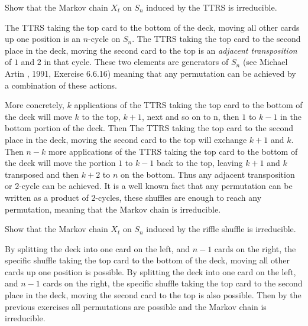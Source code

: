 \documentclass[12pt]{article}
\begin{document}
\begin{exercise}
    Show that the Markov chain \( X_t \) on \( S_n \) induced by the
    TTRS is irreducible.
\end{exercise}
\begin{solution}
    The TTRS taking the top card to the bottom of the deck, moving all
    other cards up one position is an \( n \)-cycle on \( S_n \). The
    TTRS taking the top card to the second place in the deck, moving the
    second card to the top is an \emph{adjacent transposition} of \( 1 \)
    and \( 2 \) in that cycle.  These two elements are generators of \(
    S_n \) (see Michael Artin , 1991, Exercise 6.6.16)
    meaning that any permutation can be achieved by a combination of
    these actions.

    More concretely, \( k \) applications of the TTRS taking the top
    card to the bottom of the deck will move \( k \) to the top, \( k+1 \),
    next and so on to n, then \( 1 \) to \( k-1 \) in the bottom portion
    of the deck.  Then The TTRS taking the top card to the second place
    in the deck, moving the second card to the top will exchange \( k+1 \)
    and \( k \).  Then \( n-k \) more applications of the TTRS taking
    the top card to the bottom of the deck will move the portion \( 1 \)
    to \( k-1 \) back to the top, leaving \( k+1 \) and \( k \)
    transposed and then \( k+2 \) to \( n \) on the bottom.  Thus any
    adjacent transposition or \( 2 \)-cycle can be achieved.  It is a
    well known fact that any permutation can be written as a product of \(
    2 \)-cycles, these shuffles are enough to reach any permutation,
    meaning that the Markov chain is irreducible.
\end{solution}
\begin{exercise}
    Show that the Markov chain \( X_t \) on \( S_n \) induced by the
    riffle shuffle is irreducible.
\end{exercise}
\begin{solution}
    By splitting the deck into one card on the left, and \( n-1 \) cards
    on the right, the specific shuffle taking the top card to the bottom
    of the deck, moving all other cards up one position is possible.  By
    splitting the deck into one card on the left, and \( n-1 \) cards on
    the right, the specific shuffle taking the top card to the second
    place in the deck, moving the second card to the top is also
    possible. Then by the previous exercises all permutations are
    possible and the Markov chain is irreducible.
\end{solution}
\end{document}
